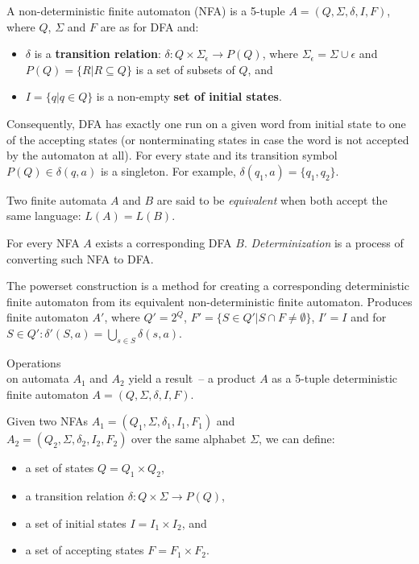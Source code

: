 \begin{definition}
    A non-deterministic finite automaton (NFA) is a 5-tuple $A = (Q, \Sigma, \delta, I, F)$, where $Q$, $\Sigma$ and $F$ are as for DFA and:
    \begin{itemize}
        \item $\delta$ is a \textbf{transition relation}: $\delta: Q \times \Sigma_{\epsilon} \rightarrow{} P(Q)$, where $\Sigma_{\epsilon} = \Sigma \cup \epsilon$ and $P(Q) = \{R | R \subseteq Q\}$ is a set of subsets of $Q$, and
        \item $I = \{q | q \in Q\}$ is a non-empty \textbf{set of initial states}.
    \end{itemize}
\end{definition}

Consequently, DFA has exactly one run on a given word from initial state to one of the accepting states (or nonterminating states in case the word is not accepted by the automaton at all). For every state and its transition symbol $P(Q) \in \delta(q, a)$ is a singleton. For example, $\delta(q_1, a) = \{ q_1, q_2 \}$.

Two finite automata $A$ and $B$ are said to be \emph{equivalent} when both accept the same language: $L(A) = L(B)$.

For every NFA $A$ exists a corresponding DFA $B$. \emph{Determinization} is a process of converting such NFA to DFA.

\begin{definition}
    The powerset construction is a method for creating a corresponding deterministic finite automaton from its equivalent non-deterministic finite automaton. Produces finite automaton $A'$, where $Q' = 2^Q$, $F' = \{S \in Q' | S \cap F \neq \emptyset\}$, $I' = I$ and for $S \in Q': \delta'(S, a) = \bigcup_{s \in S} \delta(s, a)$.
\end{definition}

\begin{definition}
Operations \\ on automata $A_1$ and $A_2$ yield a result~-- a product $A$ as a 5-tuple deterministic finite automaton $A = (Q, \Sigma, \delta, I, F)$.

Given two NFAs $A_1 = (Q_1, \Sigma, \delta_1, I_1, F_1)$ and \\ $A_2 = (Q_2, \Sigma, \delta_2, I_2, F_2)$ over the same alphabet $\Sigma$, we can define:
\begin{itemize}
    \item a set of states $Q = Q_1 \times Q_2$,
    \item a transition relation $\delta: Q \times \Sigma \rightarrow{} P(Q)$,
    \item a set of initial states $I = I_1 \times I_2$, and
    \item a set of accepting states $F = F_1 \times F_2$.
\end{itemize}
\end{definition}

